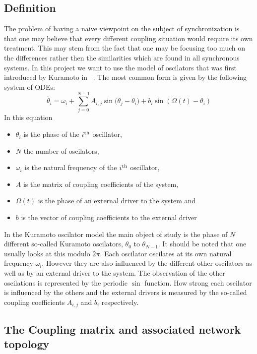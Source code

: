 \label{sec:kuramoto}

\subsection{Definition}
The problem of having a naive viewpoint on the subject of synchronization is that one may believe that every different coupling situation would require its own treatment. This may stem from the fact that one may be focusing too much on the differences rather then the similarities which are found in all synchronous systems.  In this project we want to use the model of oscilators that was first introduced by Kuramoto in ~\cite{book:kura}. The most common form is given by the following system of ODEs:
\[
\dot{\theta_i} = \omega_i + \sum_{j = 0}^{N - 1}{A_{i, j}\sin({\theta_j - \theta_i}}) + b_i \sin(\Omega(t) - \theta_i)
\]
In this equation
\begin{itemize}
	\item $\theta_i$ is the phase of the $i\textsuperscript{th}$ oscillator, 
	\item $N$ the number of oscilators, 
	\item $\omega_i$ is the natural frequency of the $i\textsuperscript{th}$ oscillator, 
	\item $A$ is the matrix of coupling coefficients of the system, 
	\item $\Omega(t)$ is the phase of an external driver to the system and
	\item $b$ is the vector of coupling coefficients to the external driver
\end{itemize}

In the Kuramoto oscilator model the main object of study is the phase of $N$ different so-called Kuramoto oscilators, $\theta_0$ to $\theta_{N - 1}$. It should be noted that one usually looks at this modulo $2 \pi$. Each oscilator oscilates at its own natural frequency $\omega_i$. However they are also influenced by the different other oscilators as well as by an external driver to the system. The observation of the other oscilations is represented by the periodic $\sin$ function. How strong each oscilator is influenced by the others and the external drivers is measured by the so-called coupling coefficients $A_{i, j}$ and $b_i$ respectively. 

\subsection{The Coupling matrix and associated network topology}

